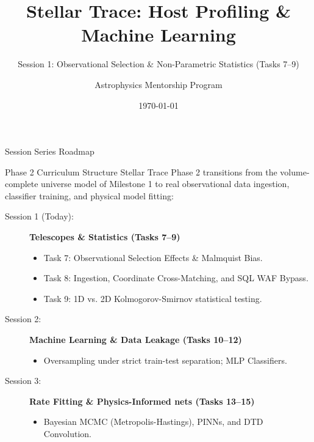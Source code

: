 \documentclass[9pt]{beamer}
\title{Stellar Trace: Host Profiling \& Machine Learning}
\subtitle{Session 1: Observational Selection \& Non-Parametric Statistics (Tasks 7--9)}
\author{Astrophysics Mentorship Program}
\date{\today}
\begin{document}
\maketitle

\begin{frame}{Session Series Roadmap}
  \begin{block}{Phase 2 Curriculum Structure}
    Stellar Trace Phase 2 transitions from the volume-complete universe model of Milestone 1 to real observational data ingestion, classifier training, and physical model fitting:
  \end{block}
  \begin{description}
    \item[Session 1 (Today):] \textbf{Telescopes \& Statistics (Tasks 7--9)}
      \begin{itemize}
        \item Task 7: Observational Selection Effects \& Malmquist Bias.
        \item Task 8: Ingestion, Coordinate Cross-Matching, and SQL WAF Bypass.
        \item Task 9: 1D vs. 2D Kolmogorov-Smirnov statistical testing.
      \end{itemize}
    \item[Session 2:] \textbf{Machine Learning \& Data Leakage (Tasks 10--12)}
      \begin{itemize}
        \item Oversampling under strict train-test separation; MLP Classifiers.
      \end{itemize}
    \item[Session 3:] \textbf{Rate Fitting \& Physics-Informed nets (Tasks 13--15)}
      \begin{itemize}
        \item Bayesian MCMC (Metropolis-Hastings), PINNs, and DTD Convolution.
      \end{itemize}
  \end{description}
\end{frame}
\end{document}
